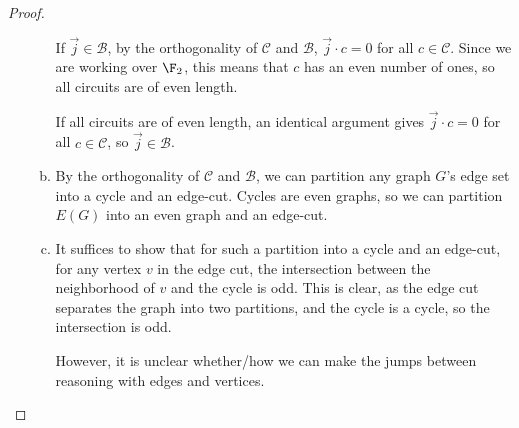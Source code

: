 \documentclass[11pt,letterpaper]{article}
\begin{document}
\begin{proof}
\begin{enumerate}[(i)]
\begin{enumerate}[(a)]
        If $\vec j\in\mathcal{B}$, by the orthogonality of $\mathcal{C}$ and $\mathcal{B}$, $\vec j\cdot c=0$ for all $c\in\mathcal{C}$. Since we are working over $\F_2$, this means that $c$ has an even number of ones, so all circuits are of even length.

        If all circuits are of even length, an identical argument gives $\vec j\cdot c=0$ for all $c\in\mathcal{C}$, so $\vec j\in\mathcal{B}$.
        \item By the orthogonality of $\mathcal{C}$ and $\mathcal{B}$, we can partition any graph $G$'s edge set into a cycle and an edge-cut. Cycles are even graphs, so we can partition $E(G)$ into an even graph and an edge-cut.
        \item It suffices to show that for such a partition into a cycle and an edge-cut, for any vertex $v$ in the edge cut, the intersection between the neighborhood of $v$ and the cycle is odd. This is clear, as the edge cut separates the graph into two partitions, and the cycle is a cycle, so the intersection is odd.
        
        However, it is unclear whether/how we can make the jumps between reasoning with edges and vertices.
    \end{enumerate}
    \end{enumerate}
    
\end{proof}
\end{document}
